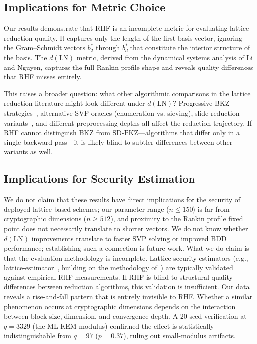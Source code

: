 \documentclass[journal=cic,version=preprint]{iacrj}
\begin{document}
\subsection{Implications for Metric Choice}

Our results demonstrate that RHF is an incomplete metric for evaluating lattice reduction quality. It captures only the length of the first basis vector, ignoring the Gram--Schmidt vectors $b^*_2$ through $b^*_d$ that constitute the interior structure of the basis. The $d(\mathrm{LN})$ metric, derived from the dynamical systems analysis of Li and Nguyen, captures the full Rankin profile shape and reveals quality differences that RHF misses entirely.

This raises a broader question: what other algorithmic comparisons in the lattice reduction literature might look different under $d(\mathrm{LN})$? Progressive BKZ strategies~\cite{EC:AWHT16}, alternative SVP oracles (enumeration vs. sieving), slide reduction variants~\cite{C:ALNS20}, and different preprocessing depths all affect the reduction trajectory. If RHF cannot distinguish BKZ from SD-BKZ---algorithms that differ only in a single backward pass---it is likely blind to subtler differences between other variants as well.

\subsection{Implications for Security Estimation}

We do not claim that these results have direct implications for the security of deployed lattice-based schemes; our parameter range ($n\leq 150$) is far from cryptographic dimensions ($n\geq 512$), and proximity to the Rankin profile fixed point does not necessarily translate to shorter vectors. We do not know whether $d(\mathrm{LN})$ improvements translate to faster SVP solving or improved BDD performance; establishing such a connection is future work. What we do claim is that the evaluation methodology is incomplete. Lattice security estimators (e.g., lattice-estimator~\cite{LatticeEstimator}, building on the methodology of~\cite{JMC:AlbPlaSco15}) are typically validated against empirical RHF measurements. If RHF is blind to structural quality differences between reduction algorithms, this validation is insufficient. Our data reveals a rise-and-fall pattern that is entirely invisible to RHF. Whether a similar phenomenon occurs at cryptographic dimensions depends on the interaction between block size, dimension, and convergence depth. A 20-seed verification at $q=3329$ (the ML-KEM modulus) confirmed the effect is statistically indistinguishable from $q=97$ ($p=0.37$), ruling out small-modulus artifacts.
\end{document}
